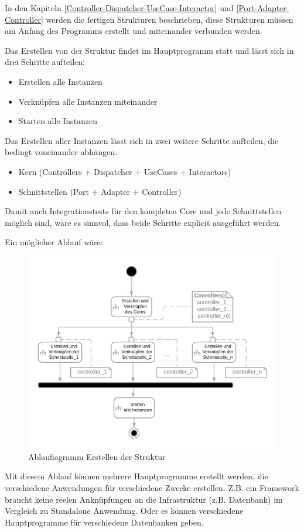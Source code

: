 In den Kapiteln \ref{Controller-Dispatcher-UseCase-Interactor} und \ref{Port-Adapter-Controller} 
werden die fertigen Strukturen beschrieben, diese Strukturen müssen am Anfang des Programms erstellt
und miteinander verbunden werden.

Das Erstellen von der Struktur findet im Hauptprogramm statt und lässt sich in drei Schritte aufteilen:
\begin{itemize}
    \item Erstellen alle Instanzen
    \item Verknüpfen alle Instanzen miteinander
    \item Starten alle Instanzen
\end{itemize}

Das Erstellen aller Instanzen lässt sich in zwei weitere Schritte aufteilen, die bedingt voneinander abhängen.
\begin{itemize}
    \item Kern (Controllers + Dispatcher + UseCases + Interactors)
    \item Schnittstellen (Port + Adapter + Controller)
\end{itemize}

Damit auch Integrationstests für den kompleten Core und jede Schnittstellen möglich sind, wäre es sinnvol, dass beide Schritte
explicit ausgeführt werden.

Ein möglicher Ablauf wäre:
\begin{figure}[H]
    \centering
    \includegraphics[width=12cm]{./images/Erstellen AD.png}
     \caption[Ablaufiagramm Erstellen der Struktur]{Ablaufiagramm Erstellen der Struktur \footnotemark}
     \label{fig:ADCreate}
\end{figure}

Mit diesem Ablauf können mehrere Hauptprogramme erstellt werden, die verschiedene Anwendungen für verschiedene Zwecke erstellen.
Z.B. ein Framework braucht keine reelen Anknüpfungen an die Infrastruktur (z.B. Datenbank) im Vergleich zu Standalone Anwendung.
Oder es können verschiedene Hauptprogramme für verschiedene Datenbanken geben.
